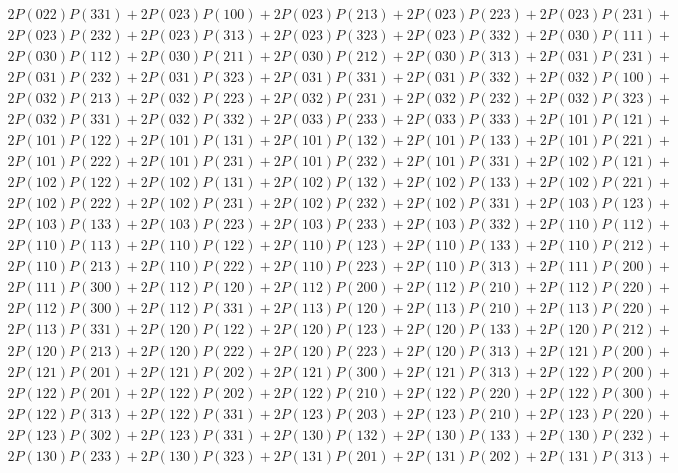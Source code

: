 \begin{align*}
	2P(022)P(331) + 2P(023)P(100) + 2P(023)P(213) + 2P(023)P(223) + 2P(023)P(231)+ \\
	2P(023)P(232) + 2P(023)P(313) + 2P(023)P(323) + 2P(023)P(332) + 2P(030)P(111)+ \\
	2P(030)P(112) + 2P(030)P(211) + 2P(030)P(212) + 2P(030)P(313) + 2P(031)P(231)+ \\
	2P(031)P(232) + 2P(031)P(323) + 2P(031)P(331) + 2P(031)P(332) + 2P(032)P(100)+ \\
	2P(032)P(213) + 2P(032)P(223) + 2P(032)P(231) + 2P(032)P(232) + 2P(032)P(323)+ \\
	2P(032)P(331) + 2P(032)P(332) + 2P(033)P(233) + 2P(033)P(333) + 2P(101)P(121)+ \\
	2P(101)P(122) + 2P(101)P(131) + 2P(101)P(132) + 2P(101)P(133) + 2P(101)P(221)+ \\
	2P(101)P(222) + 2P(101)P(231) + 2P(101)P(232) + 2P(101)P(331) + 2P(102)P(121)+ \\
	2P(102)P(122) + 2P(102)P(131) + 2P(102)P(132) + 2P(102)P(133) + 2P(102)P(221)+ \\
	2P(102)P(222) + 2P(102)P(231) + 2P(102)P(232) + 2P(102)P(331) + 2P(103)P(123)+ \\
	2P(103)P(133) + 2P(103)P(223) + 2P(103)P(233) + 2P(103)P(332) + 2P(110)P(112)+ \\
	2P(110)P(113) + 2P(110)P(122) + 2P(110)P(123) + 2P(110)P(133) + 2P(110)P(212)+ \\
	2P(110)P(213) + 2P(110)P(222) + 2P(110)P(223) + 2P(110)P(313) + 2P(111)P(200)+ \\
	2P(111)P(300) + 2P(112)P(120) + 2P(112)P(200) + 2P(112)P(210) + 2P(112)P(220)+ \\
	2P(112)P(300) + 2P(112)P(331) + 2P(113)P(120) + 2P(113)P(210) + 2P(113)P(220)+ \\
	2P(113)P(331) + 2P(120)P(122) + 2P(120)P(123) + 2P(120)P(133) + 2P(120)P(212)+ \\
	2P(120)P(213) + 2P(120)P(222) + 2P(120)P(223) + 2P(120)P(313) + 2P(121)P(200)+ \\
	2P(121)P(201) + 2P(121)P(202) + 2P(121)P(300) + 2P(121)P(313) + 2P(122)P(200)+ \\
	2P(122)P(201) + 2P(122)P(202) + 2P(122)P(210) + 2P(122)P(220) + 2P(122)P(300)+ \\
	2P(122)P(313) + 2P(122)P(331) + 2P(123)P(203) + 2P(123)P(210) + 2P(123)P(220)+ \\
	2P(123)P(302) + 2P(123)P(331) + 2P(130)P(132) + 2P(130)P(133) + 2P(130)P(232)+ \\
	2P(130)P(233) + 2P(130)P(323) + 2P(131)P(201) + 2P(131)P(202) + 2P(131)P(313)+ \\

\end{align*}
